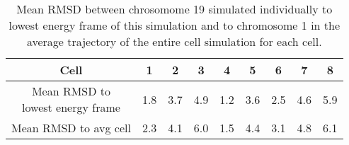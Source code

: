 \begin{table}[ht]
\centering
  \caption{Mean RMSD between chrosomome 19 simulated individually to lowest energy frame of this simulation and to chromosome 1 in the average trajectory of the entire cell simulation for each cell.}
  \label{tab:chrom19_mean_rmsds}
  \begin{tabular}{c @{\phantom{abc}} S S S S S S S S}
  \toprule
    Cell & 1 & 2 & 3 & 4 & 5 & 6 & 7 & 8 \\
  \midrule
    \parbox{4cm}{\centering Mean RMSD to \\ lowest energy frame} & 1.8 & 3.7 & 4.9 & 1.2 & 3.6 & 2.5 & 4.6 & 5.9 \\
    Mean RMSD to avg cell & 2.3 & 4.1 & 6.0 & 1.5 & 4.4 & 3.1 & 4.8 & 6.1 \\
  \bottomrule
  \end{tabular}
\end{table}


